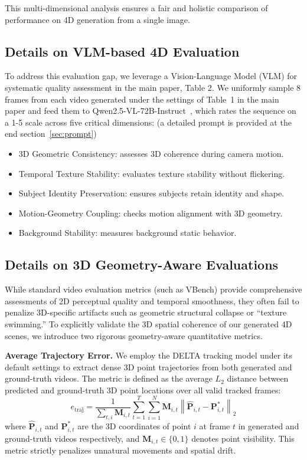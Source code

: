 This multi-dimensional analysis ensures a fair and holistic comparison of performance on 4D generation from a single image. 

\subsection{Details on VLM-based 4D Evaluation}

To address this evaluation gap, we leverage a Vision-Language Model (VLM) for systematic quality assessment in the main paper, Table 2. We uniformly sample 8 frames from each video generated under the settings of Table~1 in the main paper and feed them to Qwen2.5-VL-72B-Instruct~\cite{bai2025qwen2}, which rates the sequence on a 1-5 scale across five critical dimensions: (a detailed prompt is provided at the end section~\ref{sec:prompt})

\begin{itemize}
\item 3D Geometric Consistency: assesses 3D coherence during camera motion.
\item Temporal Texture Stability: evaluates texture stability without flickering.
\item Subject Identity Preservation: ensures subjects retain identity and shape.
\item Motion-Geometry Coupling: checks motion alignment with 3D geometry.
\item Background Stability: measures background static behavior.
\end{itemize}

\subsection{Details on 3D Geometry-Aware Evaluations}
\label{app:geometry_metrics}

While standard video evaluation metrics (such as VBench) provide comprehensive assessments of 2D perceptual quality and temporal smoothness, they often fail to penalize 3D-specific artifacts such as geometric structural collapse or ``texture swimming.'' To explicitly validate the 3D spatial coherence of our generated 4D scenes, we introduce two rigorous geometry-aware quantitative metrics.

\noindent\textbf{Average Trajectory Error.}
We employ the DELTA tracking model under its default settings to extract dense 3D point trajectories from both generated and ground-truth videos. The metric is defined as the average $L_2$ distance between predicted and ground-truth 3D point locations over all valid tracked frames:
\begin{equation}
    e_{\text{traj}} = \frac{1}{\sum_{t,i} \mathbf{M}_{i,t}} \sum_{t=1}^{T} \sum_{i=1}^{N} \mathbf{M}_{i,t} \left\| \hat{\mathbf{P}}_{i,t} - \mathbf{P}^*_{i,t} \right\|_2
\end{equation}
where $\hat{\mathbf{P}}_{i,t}$ and $\mathbf{P}^*_{i,t}$ are the 3D coordinates of point $i$ at frame $t$ in generated and ground-truth videos respectively, and $\mathbf{M}_{i,t} \in \{0, 1\}$ denotes point visibility. This metric strictly penalizes unnatural movements and spatial drift.

